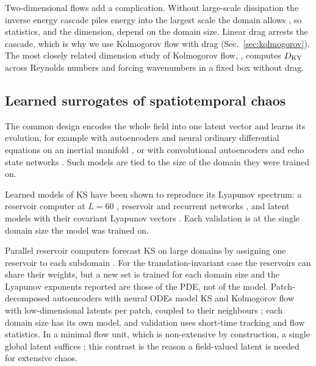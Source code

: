 Two-dimensional flows add a complication. Without large-scale
dissipation the inverse energy cascade piles energy into the largest
scale the domain allows
\citep{kraichnan1967,smithyakhot1993,boffettaecke2012}, so statistics,
and the dimension, depend on the domain size. Linear drag arrests the
cascade, which is why we use Kolmogorov flow with drag
(Sec.~\ref{sec:kolmogorov}). The most closely related dimension study of
Kolmogorov flow, \citet{kolmogorovregimes2026}, computes $D_{\mathrm{KY}}$ across
Reynolds numbers and forcing wavenumbers in a fixed box without drag.

\subsection{Learned surrogates of spatiotemporal chaos}
\label{sec:bg_surrogates}

 The common design encodes the whole field
into one latent vector and learns its evolution, for example with
autoencoders and neural ordinary differential equations on an inertial
manifold \citep{linotgraham2020,linotgraham2022}, or with convolutional
autoencoders and echo state networks \citep{racca2023}. Such models are
tied to the size of the domain they were trained on.

 Learned models of KS have been shown to
reproduce its Lyapunov spectrum: a reservoir computer at $L=60$
\citep{pathak2017}, reservoir and recurrent networks
\citep{vlachas2020}, and latent models with their covariant Lyapunov
vectors \citep{ozalp2023,ozalpmagri2025}. Each validation is at the
single domain size the model was trained on.

 Parallel reservoir computers
forecast KS on large domains by assigning one reservoir to each
subdomain \citep{pathak2018}. For the translation-invariant case the
reservoirs can share their weights, but a new set is trained for each
domain size and the Lyapunov exponents reported are those of the PDE,
not of the model. Patch-decomposed autoencoders with neural ODEs model
KS and Kolmogorov flow with low-dimensional latents per patch, coupled to
their neighbours \citep{constanteamores2024}; each domain size has its
own model, and validation uses short-time tracking and flow statistics.
In a minimal flow unit, which is non-extensive by construction, a single
global latent suffices \citep{constanteamores2025}; this contrast is the
reason a field-valued latent is needed for extensive chaos.

